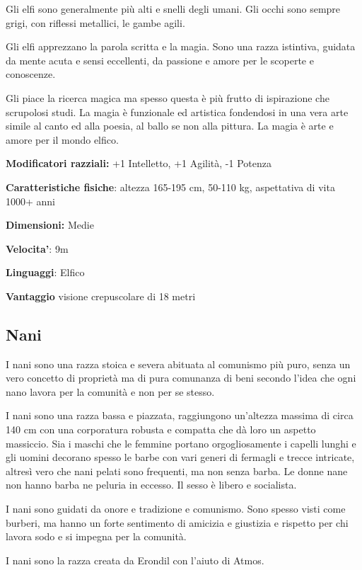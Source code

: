 \documentclass[a4paper,11pt,twoside,openany]{book}
\begin{document}
Gli elfi sono generalmente più alti e snelli degli umani. Gli occhi sono sempre grigi, con riflessi metallici, le gambe agili.

Gli elfi apprezzano la parola scritta e la magia. Sono una razza istintiva, guidata da mente acuta e sensi eccellenti, da passione e amore per le scoperte e conoscenze.

Gli piace la ricerca magica ma spesso questa è più frutto di ispirazione che scrupolosi studi. La magia è funzionale ed artistica fondendosi in una vera arte simile al canto ed alla poesia, al ballo se non alla pittura.
La magia è arte e amore per il mondo elfico.


\textbf{Modificatori razziali:} +1 Intelletto, +1 Agilità, -1 Potenza

\textbf{Caratteristiche fisiche}: altezza 165-195 cm, 50-110 kg, aspettativa
di vita 1000+ anni

\textbf{Dimensioni:} Medie

\textbf{Velocita'}: 9m

\textbf{Linguaggi}: Elfico

\textbf{Vantaggio} visione crepuscolare di 18 metri

\subsection{Nani}

\label{nani}

I nani sono una razza stoica e severa abituata al comunismo più puro, senza un vero concetto di proprietà ma di pura comunanza di beni secondo l'idea che ogni nano lavora per la comunità e non per se stesso.

I nani sono una razza bassa e piazzata, raggiungono un'altezza massima di circa 140 cm con una corporatura robusta e compatta che dà loro un aspetto massiccio. Sia i maschi che le femmine portano orgogliosamente i capelli lunghi e gli uomini decorano spesso le barbe con vari generi di fermagli e trecce intricate, altresì vero che nani pelati sono frequenti, ma non senza barba. Le donne nane non hanno barba ne peluria in eccesso. Il sesso è libero e socialista.

I nani sono guidati da onore e tradizione e comunismo. Sono spesso visti come burberi, ma hanno un forte sentimento di amicizia e giustizia e rispetto per chi lavora sodo e si impegna per la comunità.

I nani sono la razza creata da Erondil con l'aiuto di Atmos.
\end{document}
